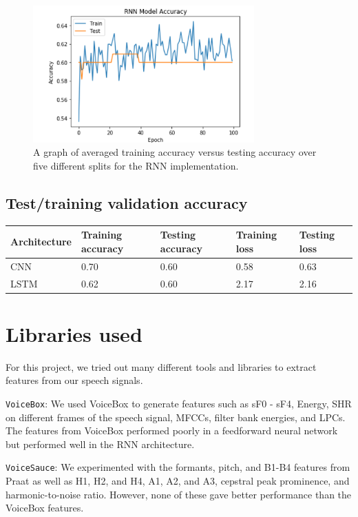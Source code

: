 \documentclass{article}
\begin{document}
\begin{figure}[htb]
	\centering
	\includegraphics[width = 8.5cm]{figs/rnn_graph}
	\caption{A graph of averaged training accuracy versus testing accuracy over five different splits for the RNN implementation.}
	\label{fig:rnn_graph}
\end{figure}

\subsection{Test/training validation accuracy}
\label{subsec:tables}

\begin{center}
	\begin{tabularx}{\linewidth}{|X|X|X|X|X|}
		\hline
		Ar\-chi\-tec\-ture & Training accuracy & Testing accuracy & Training loss & Testing loss \\
		\hline
		CNN & 0.70 & 0.60 & 0.58 & 0.63 \\
		\hline
		LSTM & 0.62 & 0.60 & 2.17 & 2.16 \\
		\hline
	\end{tabularx}
\end{center}

\section{Libraries used}
\label{sec:libraries}

For this project, we tried out many different tools and libraries to extract features from our speech signals.

\texttt{VoiceBox}: We used VoiceBox to generate features such as sF0 - sF4, Energy, SHR on different frames of the speech signal, MFCCs, filter bank energies, and LPCs.
The features from VoiceBox performed poorly in a  feedforward neural network but performed well in the RNN architecture.

\texttt{VoiceSauce}: We experimented with the formants, pitch, and B1-B4 features from Praat as well as H1, H2, and H4, A1, A2, and A3, cepstral peak prominence, and harmonic-to-noise ratio.
However, none of these gave better performance than the VoiceBox features.
\end{document}
